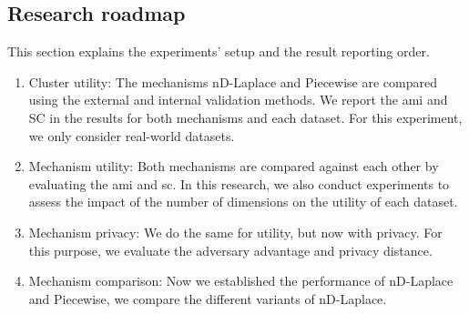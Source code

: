 \subsection{Research roadmap} \label{research-roadmap}
This section explains the experiments' setup and the result reporting order.
\begin{enumerate}
    \item Cluster utility: The mechanisms nD-Laplace and Piecewise are compared using the external and internal validation methods.
          We report the \gls{ami} and SC in the results for both mechanisms and each dataset.
          For this experiment, we only consider real-world datasets.
    \item Mechanism utility: Both mechanisms are compared against each other by evaluating the \gls{ami} and \gls{sc}.
          In this research, we also conduct experiments to assess the impact of the number of dimensions on the utility of each dataset.
    \item Mechanism privacy: We do the same for utility, but now with privacy.
          For this purpose, we evaluate the adversary advantage and privacy distance.
    \item Mechanism comparison: Now we established the performance of nD-Laplace and Piecewise, we compare the different variants of nD-Laplace.

\end{enumerate}

%

